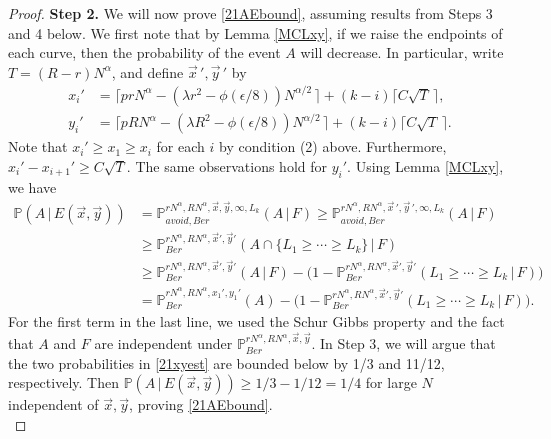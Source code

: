 \begin{proof}
		\noindent\textbf{Step 2.} We will now prove \eqref{21AEbound}, assuming results from Steps 3 and 4 below. We first note that by Lemma \ref{MCLxy}, if we raise the endpoints of each curve, then the probability of the event $A$ will decrease. In particular, write $T = (R-r)N^\alpha$, and define $\vec{x}\,',\vec{y}\,'$ by
		\begin{align*}
		x_i' &= \lceil prN^\alpha - (\lambda r^2 - \phi(\epsilon/8))N^{\alpha/2}\,\rceil + (k-i)\lceil C\sqrt{T}\,\rceil,\\
		y_i' &= \lceil pRN^\alpha - (\lambda R^2 - \phi(\epsilon/8))N^{\alpha/2}\,\rceil + (k-i)\lceil C\sqrt{T}\,\rceil.
		\end{align*}
		Note that $x_i' \geq x_1 \geq x_i$ for each $i$ by condition (2) above. Furthermore, $x_i' - x_{i+1}' \geq C\sqrt{T}$. The same observations hold for $y_i'$. Using Lemma \ref{MCLxy}, we have
		\begin{align}
		\mathbb{P}(A\,|\,E(\vec{x},\vec{y})) &= \mathbb{P}^{rN^\alpha, RN^\alpha,\vec{x},\vec{y},\infty,L_k}_{avoid,Ber} (A\,|\,F) \geq \mathbb{P}^{rN^\alpha, RN^\alpha,\vec{x}\,',\vec{y}\,',\infty,L_k}_{avoid,Ber} (A\,|\,F) \nonumber \\
		&\geq \mathbb{P}^{rN^\alpha, RN^\alpha,\vec{x}',\vec{y}'}_{Ber} (A\cap\{L_1 \geq \cdots \geq L_k\}\,|\,F) \nonumber \\
		&\geq \mathbb{P}^{rN^\alpha, RN^\alpha,\vec{x}',\vec{y}'}_{Ber} (A\,|\,F) - \big( 1 - \mathbb{P}^{rN^\alpha, RN^\alpha,\vec{x}',\vec{y}'}_{Ber} (L_1 \geq \cdots \geq L_k\,|\,F)\big) \nonumber\\
		&= \mathbb{P}^{rN^\alpha, RN^\alpha,x_1',y_1'}_{Ber} (A) - \big( 1 - \mathbb{P}^{rN^\alpha, RN^\alpha,\vec{x}',\vec{y}'}_{Ber} (L_1 \geq \cdots \geq L_k\,|\,F)\big). \label{21xyest}
		\end{align}
		For the first term in the last line, we used the Schur Gibbs property and the fact that $A$ and $F$ are independent under $\mathbb{P}^{rN^\alpha, RN^\alpha,\vec{x},\vec{y}}_{Ber}$. In Step 3, we will argue that the two probabilities in \eqref{21xyest} are bounded below by 1/3 and 11/12, respectively. Then $\mathbb{P}(A\,|\,E(\vec{x},\vec{y})) \geq 1/3 - 1/12 = 1/4$ for large $N$ independent of $\vec{x},\vec{y}$, proving \eqref{21AEbound}.\\
		

\end{proof}
